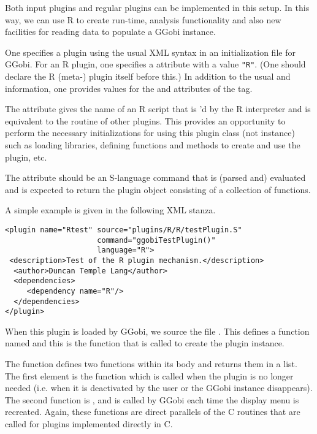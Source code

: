 \documentclass{article}
\begin{document}
Both input plugins and regular plugins can be implemented in this
setup. In this way, we can use R to create run-time, analysis
functionality and also new facilities for reading data to populate a
GGobi instance.

One specifies a plugin using the usual XML  syntax in
an initialization file for GGobi.  For an R plugin, one specifies a
 attribute with a value \verb+"R"+.  (One should
declare the R (meta-) plugin itself before this.)  In addition to the
usual  and  information, one
provides values for the  and  attributes
of the  tag.

The  attribute gives the name of an R script that is
'd by the R interpreter and is equivalent to the
 routine of other plugins.  This provides an
opportunity to perform the necessary initializations for using this
plugin class (not instance) such as loading libraries, defining
functions and methods to create and use the plugin, etc.

The  attribute should be an S-language command that is
(parsed and) evaluated and is expected to return the plugin object
consisting of a collection of functions.

A simple example is given in the following XML stanza.
\begin{verbatim}
<plugin name="Rtest" source="plugins/R/R/testPlugin.S" 
                     command="ggobiTestPlugin()"
                     language="R">
 <description>Test of the R plugin mechanism.</description>
  <author>Duncan Temple Lang</author>
  <dependencies>
     <dependency name="R"/>
  </dependencies>
</plugin>
\end{verbatim}
When this plugin is loaded by GGobi, we source the file
.  This defines a function named
 and this is the function that is called to
create the plugin instance.

The  function defines two functions within
its body and returns them in a list.  The first element is the
 function which is called when the plugin is no
longer needed (i.e. when it is deactivated by the user or the GGobi
instance disappears).  The second function is
, and is called by GGobi each time the
display menu is recreated. Again, these functions
are direct parallels of the C routines that are called for
plugins implemented directly in C.
\end{document}
